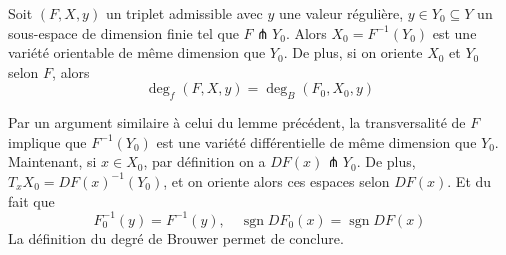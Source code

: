 \documentclass[memoire.tex]{subfiles}
\begin{document}
\begin{lemme}
    Soit $(F,X,y)$ un triplet admissible avec $y$ une valeur régulière, $y\in Y_0\subseteq Y$ un sous-espace de dimension finie tel que $F\pitchfork Y_0$. Alors $X_0=F^{-1}(Y_0)$ est une variété orientable de même dimension que $Y_0$. De plus, si on oriente $X_0$ et $Y_0$ selon $F$, alors 
    \begin{equation*}
        \deg_f(F,X,y)=\deg_B(F_0,X_0,y)
    \end{equation*}
\end{lemme}

\begin{preuve}
    Par un argument similaire à celui du lemme précédent, la transversalité de $F$ implique que $F^{-1}(Y_0)$ est une variété différentielle de même dimension que $Y_0$. Maintenant, si $x\in X_0 $, par définition on a $DF(x)\pitchfork Y_0$. De plus, $T_x X_0=DF(x)^{-1}(Y_0)$, et on oriente alors ces espaces selon $DF(x)$. Et du fait que
    \begin{equation*}
        F_0^{-1}(y)=F^{-1}(y),\quad \operatorname*{sgn}DF_0(x)=\operatorname*{sgn}DF(x)
    \end{equation*}La définition du degré de Brouwer permet de conclure.
\end{preuve}
\end{document}
